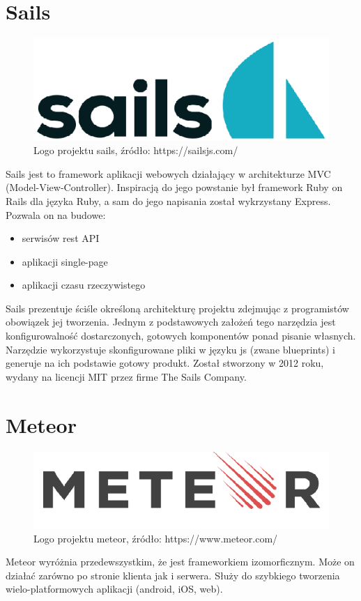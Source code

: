 \documentclass[12pt]{report}
\begin{document}
   \section{Sails}
    \begin{figure}[!hb]
      \centering
      \includegraphics[width=\textwidth,height=\textheight,keepaspectratio]{logo_sails.png} 
      \caption{Logo projektu sails, źródło: https://sailsjs.com/}
    \end{figure}
    Sails jest to framework aplikacji webowych działający w architekturze MVC (Model-View-Controller).
    Inspiracją do jego powstanie był framework Ruby on Rails dla języka Ruby, a sam do jego napisania został wykrzystany Express.
    Pozwala on na budowe:
     \begin{itemize}
      \item serwisów rest API
      \item aplikacji single-page 
      \item aplikacji czasu rzeczywistego
    \end{itemize} 
    Sails prezentuje ściśle określoną architekturę projektu zdejmując z programistów obowiązek jej tworzenia.
    Jednym z podstawowych założeń tego narzędzia jest konfigurowalność dostarczonych, gotowych komponentów ponad pisanie własnych.
    Narzędzie wykorzystuje skonfigurowane pliki w języku js (zwane blueprints) i generuje na ich podstawie gotowy produkt.
    Został stworzony w 2012 roku, wydany na licencji MIT przez firme The Sails Company.

  \section{Meteor}
    \begin{figure}[!hb]
      \centering
      \includegraphics[width=\textwidth,height=\textheight,keepaspectratio]{logo_meteor.png} 
      \caption{Logo projektu meteor, źródło: https://www.meteor.com/}
    \end{figure}
    Meteor wyróżnia przedewszystkim, że jest frameworkiem izomorficznym. 
    Może on działać zarówno po stronie klienta jak i serwera.
    Służy do szybkiego tworzenia wielo-platformowych aplikacji (android, iOS, web).
    
\end{document}
